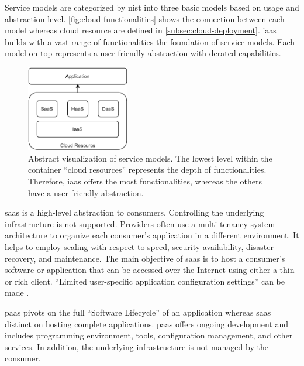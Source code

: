 Service models are categorized by \ac{nist} into three basic models based on usage and abstraction level.
\autoref{fig:cloud-functionalities} shows the connection between each model whereas cloud resource are defined in \autoref{subsec:cloud-deployment}.
\ac*{iaas} builds with a vast range of functionalities the foundation of service models.
Each model on top represents a user-friendly abstraction with derated capabilities.

\begin{figure}[ht]
    \centering
    \includegraphics[width=0.4\textwidth]{figures/cloud-service-models.pdf}
    \caption[Abstract visualization of service models]{
        Abstract visualization of service models.
        The lowest level within the container \enquote{cloud resources} represents the depth of functionalities.
        Therefore, \ac{iaas} offers the most functionalities, whereas the others have a user-friendly abstraction.
    }
    \label{fig:cloud-functionalities}
\end{figure}

\ac{saas} is a high-level abstraction to consumers. Controlling the underlying infrastructure is not supported.
Providers often use a multi-tenancy system architecture to organize each consumer's application in a different environment.
It helps to employ scaling with respect to speed, security availability, disaster recovery, and maintenance.
The main objective of \ac{saas} is to host a consumer's software or application that can be accessed over the Internet using either a thin or rich client. \cite{Dillon2010}
\enquote{Limited user-specific application configuration settings} can be made \cite{Mell2011}.

\ac{paas} pivots on the full \enquote{Software Lifecycle} of an application whereas \ac{saas} distinct on hosting complete applications.
\ac{paas} offers ongoing development and includes programming environment, tools, configuration management, and other services.
In addition, the underlying infrastructure is not managed by the consumer. \cite{Mell2011}

